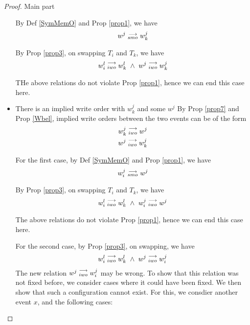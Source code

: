 \begin{proof}{Main part}
\begin{itemize}
                        By Def \ref{SymMemO} and Prop \ref{prop1}, we have
                        \begin{align*}
                            w^j\stackrel{\longrightarrow}{_{smo}}w_k^j
                        \end{align*}

                        By Prop \ref{prop3}, on swapping $T_i$ and $T_k$, we have 
                        \begin{align*}
                            \reln{w_i^l}{iwo}{w_k^l} \ \wedge \ \reln{w^j}{iwo}{w_k^j}
                        \end{align*}

                        THe above relations do not violate Prop \ref{prop1}, hence we can end this case here. 
                    
                    \item There is an implied write order with $w_k^j$ and some $w^j$
                        By Prop \ref{prop7} and Prop \ref{Wbel}, implied write orders between the two events can be of the form 
                        \begin{align*}
                            w_k^j\stackrel{\longrightarrow}{_{iwo}}w^j \\ 
                            w^j\stackrel{\longrightarrow}{_{iwo}}w_k^j  
                        \end{align*}

                        For the first case, by Def \ref{SymMemO} and Prop \ref{prop1}, we have
                        \begin{align*}
                            w_i^j\stackrel{\longrightarrow}{_{smo}}w^j
                        \end{align*}

                        By Prop \ref{prop3}, on swapping $T_i$ and $T_k$, we have 
                        \begin{align*}
                            \reln{w_i^l}{iwo}{w_k^l} \ \wedge \ \reln{w_i^j}{iwo}{w^j}
                        \end{align*}

                        The above relations do not violate Prop \ref{prop1}, hence we can end this case here. 

                        For the second case, by Prop \ref{prop3}, on swapping, we have 
                        \begin{align*}
                            \reln{w_i^l}{iwo}{w_k^l} \ \wedge \ \reln{w^j}{iwo}{w_i^j}
                        \end{align*}
                        The new relation $w^j\stackrel{\longrightarrow}{_{iwo}}w_i^j$ may be wrong. 
                        To show that this relation was not fixed before, we consider cases where it could have been fixed. We then show that such a configuration cannot exist. For this, we consdier another event $x$, and the following cases:


\end{itemize}
\end{proof}
